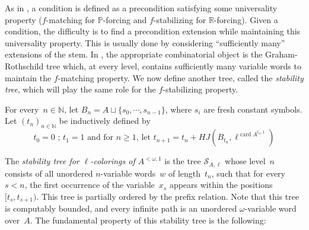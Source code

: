 \documentclass{article}
\def\PP{\mathbb{P}}
\def\RR{\mathbb{R}}
\def\Sc{\mathcal{S}}
\newcommand{\NN}[0]{\mathbb{N}}
\newcommand{\card}{\operatorname{card}} %
\def\qt#1{``#1''}%
\numberwithin{theorem}{section}
\theoremstyle{definition}
\begin{document}
As in , a condition is defined as a precondition satisfying some universality property ($f$-matching for $\PP$-forcing and $f$-stabilizing for $\RR$-forcing). Given a condition, the difficulty is to find a precondition extension while maintaining this universality property. This is usually done by considering \qt{sufficiently many} extensions of the stem.
In , the appropriate combinatorial object is the Graham-Rothschild tree which, at every level, contains sufficiently many variable words to maintain the $f$-matching property. We now define another tree, called the \emph{stability tree}, which will play the same role for the $f$-stabilizing property.
\smallskip

For every~$n \in \NN$, let $B_n = A \sqcup \{ s_0, \cdots, s_{n-1} \}$, where $s_i$ are fresh constant symbols.
Let $(t_n)_{n \in \NN}$ be inductively defined by
$$t_0 = 0 \mbox{ ; } t_1 = 1 \mbox{ and for } n \geq 1 \mbox{, let } t_{n+1} = t_n + HJ(B_{t_n}, \ell^{\card A^{t_n,1}})$$

The \emph{stability tree for $\ell$-colorings of $A^{<\omega, 1}$} is the tree $\Sc_{A,\ell}$ whose level~$n$ consists of all unordered $n$-variable words~$w$ of length~$t_n$, such that for every~$s < n$, the first occurrence of the variable~$x_s$ appears within the positions $[t_s, t_{s+1})$. This tree is partially ordered by the prefix relation. Note that this tree is computably bounded, and every infinite path is an unordered $\omega$-variable word over~$A$. The fundamental property of this stability tree is the following:
\end{document}
